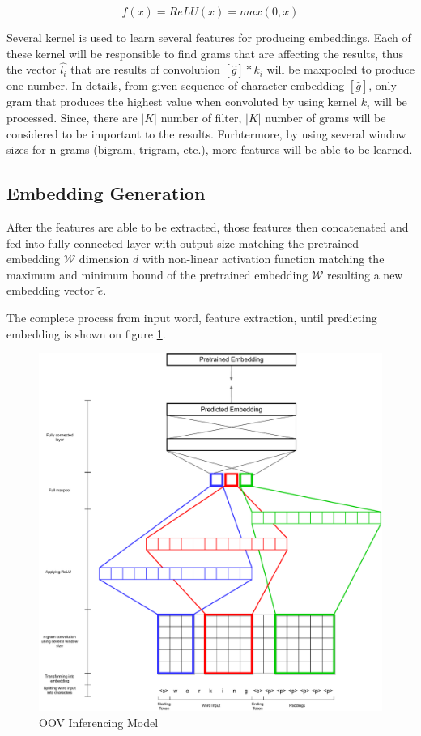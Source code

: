         \begin{equation}
            \label{eq:relu}
            f(x) = ReLU(x) = max(0,x)
        \end{equation}

        Several kernel is used to learn several features for producing
        embeddings. Each of these kernel will be responsible to find
        grams that are affecting the results, thus the vector
        $\hat{l_i}$ that are results of convolution $[\hat{g}] * k_i$
        will be maxpooled to produce one number. In details, from
        given sequence of character embedding $[\hat{g}]$, only gram
        that produces the highest value when convoluted by using
        kernel $k_i$ will be processed. Since, there are $\vert K
        \vert$ number of filter, $\vert K \vert$ number of grams will
        be considered to be important to the results. Furhtermore, by
        using several window sizes for n-grams (bigram, trigram,
        etc.), more features will be able to be learned.

    \subsection{Embedding Generation}
        After the features are able to be extracted, those features
        then concatenated and fed into fully connected layer with
        output size matching the pretrained embedding $\mathcal{W}$
        dimension $d$ with non-linear activation function matching the
        maximum and minimum bound of the pretrained embedding
        $\mathcal{W}$ resulting a new embedding vector $\tilde{e}$.

        The complete process from input word, feature extraction,
        until predicting embedding is shown on figure \ref{fig:model}.
        
        \begin{figure}
            \centering
            \includegraphics[width=.8\linewidth]{images/model.pdf}
            \caption{OOV Inferencing Model}
            \label{fig:model}
        \end{figure}


